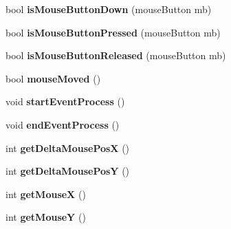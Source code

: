 \begin{DoxyCompactItemize}
\item 
\hypertarget{class_c_irr_event_receiver_afe5c69ea31fa8f92ce9c74d1dffd2348}{
bool {\bfseries isMouseButtonDown} (mouseButton mb)}
\label{class_c_irr_event_receiver_afe5c69ea31fa8f92ce9c74d1dffd2348}

\item 
\hypertarget{class_c_irr_event_receiver_a2b4e17538beef9232ba697824891b2de}{
bool {\bfseries isMouseButtonPressed} (mouseButton mb)}
\label{class_c_irr_event_receiver_a2b4e17538beef9232ba697824891b2de}

\item 
\hypertarget{class_c_irr_event_receiver_a7ea08b58b4990ca744c59d01221484ad}{
bool {\bfseries isMouseButtonReleased} (mouseButton mb)}
\label{class_c_irr_event_receiver_a7ea08b58b4990ca744c59d01221484ad}

\item 
\hypertarget{class_c_irr_event_receiver_a2ac6a4d07fb11e98b40f30dc0a1faad6}{
bool {\bfseries mouseMoved} ()}
\label{class_c_irr_event_receiver_a2ac6a4d07fb11e98b40f30dc0a1faad6}

\item 
\hypertarget{class_c_irr_event_receiver_aae7fe2c989401bdacfe38854d2692bbb}{
void {\bfseries startEventProcess} ()}
\label{class_c_irr_event_receiver_aae7fe2c989401bdacfe38854d2692bbb}

\item 
\hypertarget{class_c_irr_event_receiver_a96052c82c722b6359a5ea1c287956951}{
void {\bfseries endEventProcess} ()}
\label{class_c_irr_event_receiver_a96052c82c722b6359a5ea1c287956951}

\item 
\hypertarget{class_c_irr_event_receiver_a31ed275d5220275ad038f271c73b62df}{
int {\bfseries getDeltaMousePosX} ()}
\label{class_c_irr_event_receiver_a31ed275d5220275ad038f271c73b62df}

\item 
\hypertarget{class_c_irr_event_receiver_a04cd569b8dd4e806b12727f070a4f700}{
int {\bfseries getDeltaMousePosY} ()}
\label{class_c_irr_event_receiver_a04cd569b8dd4e806b12727f070a4f700}

\item 
\hypertarget{class_c_irr_event_receiver_a73f153a65713615e5636c66cccea48e3}{
int {\bfseries getMouseX} ()}
\label{class_c_irr_event_receiver_a73f153a65713615e5636c66cccea48e3}

\item 
\hypertarget{class_c_irr_event_receiver_a95dfe8c3d693b57bdc58e63d334d887c}{
int {\bfseries getMouseY} ()}
\label{class_c_irr_event_receiver_a95dfe8c3d693b57bdc58e63d334d887c}


\end{DoxyCompactItemize}
